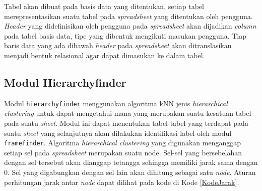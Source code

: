 Tabel akan dibuat pada basis data yang ditentukan, setiap tabel merepresentasikan suatu tabel pada \textit{spreadsheet} yang ditentukan oleh pengguna. \textit{Header} yang didefinisikan oleh pengguna pada \textit{spreadsheet} akan dijadikan \textit{column} pada tabel basis data, tipe yang dibentuk mengikuti masukan pengguna. Tiap baris data yang ada dibawah \textit{header} pada \textit{spreadsheet} akan ditranslasikan menjadi bentuk relasional agar dapat dimasukan ke dalam tabel.

\subsection{Modul Hierarchyfinder}
Modul \texttt{hierarchyfinder} menggunakan algoritma kNN jenis \textit{hierarchical clustering} untuk dapat mengetahui mana yang merupakan suatu kesatuan tabel pada suatu \textit{sheet}. Modul ini dapat menentukan tabel-tabel yang terdapat pada suatu \textit{sheet} yang selanjutnya akan dilakukan identifikasi label oleh modul \texttt{framefinder}. Algoritma \textit{hierarchical clustering} yang digunakan menganggap setiap sel pada \textit{spreadsheet} merupakan suatu node. Sel-sel yang bersebelahan dengan sel tersebut akan dianggap tetangga sehingga memiliki jarak sama dengan 0. Sel yang digabungkan dengan sel lain akan dihitung sebagai satu \textit{node}. Aturan perhitungan jarak antar \textit{node} dapat dilihat pada kode di Kode \ref{KodeJarak}.\\

